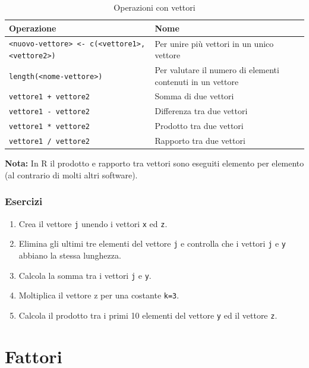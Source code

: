 \documentclass[
]{book}
\providecommand{\tightlist}{%
  \setlength{\itemsep}{0pt}\setlength{\parskip}{0pt}}
\begin{document}
\begin{table}[!h]

\caption{\label{tab:table-vector-operators}Operazioni con vettori}
\centering
\begin{tabular}[t]{l|l}
\hline
Operazione & Nome\\
\hline
\texttt{<nuovo-vettore> <- c(<vettore1>, <vettore2>)} & Per unire più vettori in un unico vettore\\
\hline
\texttt{length(<nome-vettore>)} & Per valutare il numero di elementi contenuti in un vettore\\
\hline
\texttt{vettore1 + vettore2} & Somma di due vettori\\
\hline
\texttt{vettore1 - vettore2} & Differenza tra due vettori\\
\hline
\texttt{vettore1 * vettore2} & Prodotto tra due vettori\\
\hline
\texttt{vettore1 / vettore2} & Rapporto tra due vettori\\
\hline
\end{tabular}
\end{table}

\textbf{Nota:} In R il prodotto e rapporto tra vettori sono eseguiti elemento per elemento (al contrario di molti altri software).

\hypertarget{esercizi-4}{%
\subsection*{Esercizi}\label{esercizi-4}}

\begin{enumerate}
\def\labelenumi{\arabic{enumi}.}
\tightlist
\item
  Crea il vettore \texttt{j} unendo i vettori \texttt{x} ed \texttt{z}.
\item
  Elimina gli ultimi tre elementi del vettore \texttt{j} e controlla che i vettori \texttt{j} e \texttt{y} abbiano la stessa lunghezza.
\item
  Calcola la somma tra i vettori \texttt{j} e \texttt{y}.
\item
  Moltiplica il vettore z per una costante \texttt{k=3}.
\item
  Calcola il prodotto tra i primi 10 elementi del vettore \texttt{y} ed il vettore \texttt{z}.
\end{enumerate}

\hypertarget{factors}{%
\chapter{Fattori}\label{factors}}
\end{document}
